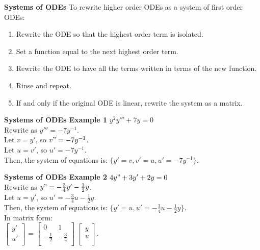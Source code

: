 \documentclass[8pt,letterpaper,boxed]{hmcpset}
\begin{document}
\textbf{Systems of ODEs}
To rewrite higher order ODEs as a system of first order ODEs:
\begin{enumerate}
    \item Rewrite the ODE so that the highest order term is isolated.
    \item Set a function equal to the next highest order term.
    \item Rewrite the ODE to have all the terms written in terms of the new function.
    \item Rinse and repeat.
    \item If and only if the original ODE is linear, rewrite the system as a matrix.
\end{enumerate}

\textbf{Systems of ODEs Example 1}
\newline
$y^2y''' + 7y = 0$ \\
Rewrite as $y''' =-7y^{-1}$. \\
Let $v=y'$, so $v"=-7y^{-1}$. \\
Let $u=v'$, so $u'=-7y^{-1}$. \\
Then, the system of equations is: $\{y'=v, v'=u, u'=-7y^{-1}\}$.

\textbf{Systems of ODEs Example 2}
\newline
$4y"+3y'+2y=0$ \\
Rewrite as $y"=-\frac{3}{4}y'-\frac{1}{2}y$. \\
Let $u=y'$, so $u'=-\frac{3}{4}u-\frac{1}{2}y$. \\
Then, the system of equations is: $\{y'=u, u'=-\frac{3}{4}u-\frac{1}{2}y\}$. \\
In matrix form: \\
$\begin{bmatrix}
y' \\
u' \\
\end{bmatrix}$
=
$\begin{bmatrix}
0 & 1 \\
-\frac{1}{2} & -\frac{3}{4} \\
\end{bmatrix}$
$\begin{bmatrix}
y \\
u \\
\end{bmatrix}$.
\end{document}
